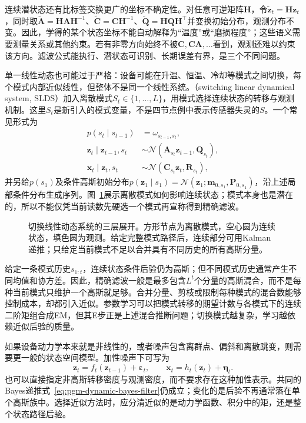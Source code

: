 连续潜状态还有比标签交换更广的坐标不确定性。对任意可逆矩阵$\bm H$，令$\widetilde{\bm z}_t=\bm H\bm z_t$，同时取$\widetilde{\bm A}=\bm H\bm A\bm H^{-1}$、$\widetilde{\bm C}=\bm C\bm H^{-1}$、$\widetilde{\bm Q}=\bm H\bm Q\bm H^\top$并变换初始分布，观测分布不变。因此，学得的某个状态坐标不能自动解释为“温度”或“磨损程度”；这些语义需要测量关系或其他约束。若有非零方向始终不被$\bm C,\bm C\bm A,\ldots$看到，观测还难以约束该方向。滤波公式能执行、潜状态可识别、长期误差有界，是三个不同问题。

单一线性动态也可能过于严格：设备可能在升温、恒温、冷却等模式之间切换，每个模式内部近似线性，但整体不是同一个线性系统。（switching linear dynamical system, SLDS）加入离散模式$S_t\in\{1,\ldots,L\}$，用模式选择连续状态的转移与观测机制。这里$S_t$是新引入的模式变量，不是四节点例中表示传感器失灵的$S$。一个常见形式为
\begin{equation}
  \begin{aligned}
    p(s_t\mid s_{t-1})&=\omega_{s_{t-1},s_t},\\
    \bm z_t\mid\bm z_{t-1},s_t
      &\sim\mathcal N(\bm A_{s_t}\bm z_{t-1},\bm Q_{s_t}),\\
    \bm x_t\mid\bm z_t,s_t
      &\sim\mathcal N(\bm C_{s_t}\bm z_t,\bm R_{s_t}),
  \end{aligned}
  \label{eq:pgm-dynamic-switching}
\end{equation}
并另给$p(s_1)$及条件高斯初始分布$p(\bm z_1\mid s_1)=\mathcal N(\bm z_1;\bm m_{0,s_1},\bm P_{0,s_1})$，沿上述局部条件分布生成序列。图~\ref{fig:pgm-dynamic-switching}展示离散模式如何影响连续状态；模式本身也是潜在的，所以不能仅凭当前读数先硬选一个模式再宣称得到精确滤波。

\begin{figure}[htbp]
  \centering
  
  \caption{切换线性动态系统的三层展开。方形节点为离散模式，空心圆为连续状态，填色圆为观测。给定完整模式路径后，连续部分可用Kalman递推；只给定当前模式不足以合并具有不同历史的所有高斯分量。}
  \label{fig:pgm-dynamic-switching}
\end{figure}

给定一条模式历史$s_{1:t}$，连续状态条件后验仍为高斯；但不同模式历史通常产生不同均值和协方差。因此，精确滤波一般是最多包含$L^t$个分量的高斯混合，而不是每种当前模式只维护一个高斯就足够。合并分量、剪枝或限制每种模式的混合数能够控制成本，却都引入近似。参数学习可以把模式转移的期望计数与各模式下的连续二阶矩组合成EM，但其E步正是上述混合推断问题；切换模式越复杂，学习越依赖近似后验的质量。

如果设备动力学本来就是非线性的，或者噪声包含离群点、偏斜和离散跳变，则需要更一般的状态空间模型。加性噪声下可写为
\begin{equation}
  \bm z_t=f_t(\bm z_{t-1})+\bm\varepsilon_t,\qquad
  \bm x_t=h_t(\bm z_t)+\bm\eta_t.
  \label{eq:pgm-dynamic-nonlinear}
\end{equation}
也可以直接指定非高斯转移密度与观测密度，而不要求存在这种加性表示。共同的Bayes递推式~\eqref{eq:pgm-dynamic-bayes-filter}仍成立；变化的是后验不再通常落在单个高斯族中。选择近似方法时，应分清近似的是动力学函数、积分中的矩，还是整个状态路径后验。

